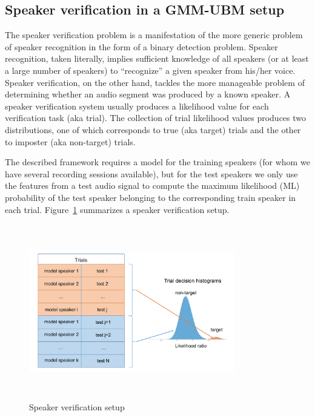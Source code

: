 \subsection{Speaker verification in a GMM-UBM setup} 
\label{ssec:ch2_ssecGMMUBM}
The speaker verification problem is a manifestation of the more generic problem of speaker recognition in the form of a binary detection problem. 
Speaker recognition, taken literally, implies sufficient knowledge of all speakers (or at least a large number of speakers) to ``recognize'' a given speaker from his/her voice. 
Speaker verification, on the other hand, tackles the more manageable problem of determining whether an audio segment was produced by a known speaker. 
A speaker verification system usually produces a likelihood value for each verification task (aka trial). 
The collection of trial likelihood values produces two distributions, one of which corresponds to true (aka target) trials and the other to imposter (aka non-target) trials. 

The described framework requires a model for the training speakers (for whom we have several recording sessions available), but for the test speakers we only use the features from a test audio signal to compute the maximum likelihood (ML) probability of the test speaker belonging to the corresponding train speaker in each trial. 
Figure~\ref{fig:speaker_verification} summarizes a speaker verification setup. 

\begin{figure}[h!]
	\centering
	\vspace{0mm}
	\includegraphics[height = 3in, width=0.8\textwidth]{figures/speaker_verification_setup}
	\vspace{-3mm}
	\caption{Speaker verification setup}
	\label{fig:speaker_verification}
	\vspace{0mm}
\end{figure}

